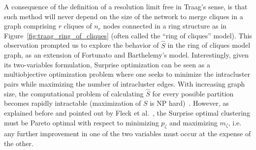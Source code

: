 A consequence of the definition of a resolution limit free in Traag's sense, is that such method will never depend on the size of the network to merge cliques in a graph comprising $r$ cliques of $n_r$ nodes connected in a ring structure as in Figure~\ref{fig:traag_ring_of_cliques} (often called the ``ring of cliques'' model).
This observation prompted us to explore the behavior of $\hat{S}$ in the ring of cliques model graph, as an extension of Fortunato and Barthelemy's model.
Interestingly, given its two-variables formulation, Surprise optimization can be seen as a multiobjective optimization problem where one seeks to minimize the intracluster pairs while maximizing the number of intracluster edges.
With increasing graph size, the computational problem of calculating $\hat{S}$ for every possible partition becomes rapidly intractable (maximization of $S$ is NP hard)~\cite{fleck2014}.
However, as explained before and pointed out by Fleck et al.~\cite{fleck2014}, the Surprise optimal clustering must be Pareto optimal with respect to minimizing $p_\zeta$ and maximizing $m_\zeta$, i.e. any further improvement in one of the two variables must occur at the expense of the other.


